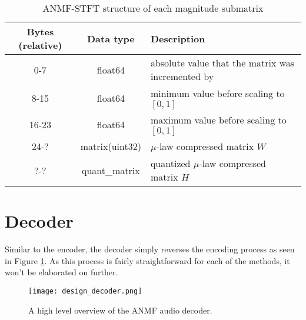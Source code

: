 \begin{table}[htbp]\caption{ANMF-STFT structure of each magnitude submatrix}
	\label{tab:anmf_stft_data}
	\centering
	\begin{tabular}{|c|c|l|}
		\hline
		Bytes (relative) & Data type & Description \\ \hline
		0-7 & float64 & absolute value that the matrix was incremented by \\
		8-15 & float64 & minimum value before scaling to $[0, 1]$ \\
		16-23 & float64 & maximum value before scaling to $[0, 1]$ \\
		24-? & matrix(uint32) & $\mu$-law compressed matrix $W$ \\
		?-? & quant\_matrix & quantized $\mu$-law compressed matrix $H$ \\
		\hline
	\end{tabular}
\end{table}

\section{Decoder}
Similar to the encoder, the decoder simply reverses the encoding process as seen in Figure \ref{fig:design_decoder}. As this process is fairly straightforward for each of the methods, it won't be elaborated on further.

\begin{figure}[ht]
	\caption[Decoder overview]{A high level overview of the ANMF audio decoder.}
	\label{fig:design_decoder}
	\centering
	\texttt{[image: design\_decoder.png]}
\end{figure}
